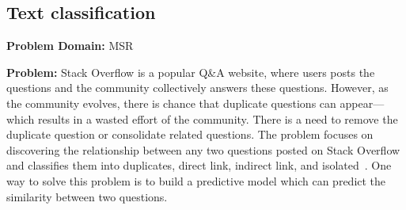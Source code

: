 \documentclass[sigconf,anonymous,review]{acmart}
\begin{document}
   

   


\subsection{Text classification}
\noindent\textbf{Problem Domain: } MSR

\noindent\textbf{Problem: } Stack Overflow is a popular Q\&A website, where users posts the questions and the community collectively answers these questions. However, as the community evolves, there is chance that duplicate questions can appear---which results in a wasted effort of the community. There is a need to remove the duplicate question or consolidate related questions. The problem focuses on discovering the relationship between any two questions posted on Stack Overflow and classifies them into duplicates, direct link, indirect link, and isolated~\cite{fu2017easy, xu2016predicting}. One way to solve this problem is to build a predictive model which can predict the similarity between two questions. 
\end{document}
